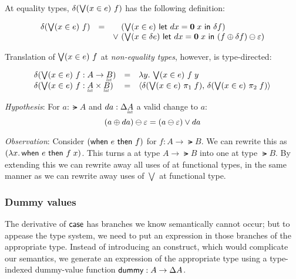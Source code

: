 \documentclass{article}
\newcommand{\dummy}{\ms{dummy}}
\begin{document}
At equality types, $\delta(\textstyle\bigvee({x \in e})\  f)$ has the following definition:

\[\begin{array}{rcl}
  \delta(\textstyle\bigvee({x \in e})\  f)
  &=& \phantom{\vee~} (\textstyle\bigvee({x \in e})\  \mathsf{let}~dx = \mathbf{0}\; x ~\mathsf{in}~ \delta f)
  \\ && \vee~ (\textstyle\bigvee({x \in \delta e})\  \mathsf{let}~dx = \mathbf{0}\; x ~\mathsf{in}~
    (f \oplus \delta f) \ominus \varepsilon)
\end{array}\]


Translation of $\textstyle\bigvee({x \in e})\  f$ at \emph{non-equality types}, however, is
type-directed:

\[\begin{array}{lcll}
  \delta(\downelim{x}{e}{f} : A \to \lat{B})
  &=& \fn\bind{y} \downelim{x}{e}{f\; y}\\
  \delta(\downelim{x}{e}{f} : \lat{A} \x \lat{B})
  &=& \pair{\delta(\downelim{x}{e}{\pi_1\; f})}
  {\delta(\downelim{x}{e}{\pi_2\; f})}
\end{array}\]

\emph{Hypothesis}: For $a : \lat{A}$ and $da : \GD\lat{A}$ a valid change to
$a$:
\begin{equation*}
  (a \oplus da) \ominus \varepsilon = (a \ominus \varepsilon)
  \vee da
\end{equation*}

\emph{Observation}: Consider $(\mathsf{when}~{e}~\mathsf{then}~{f})$ for $f : A \to \lat{B}$. We can
rewrite this as $(\lambda x.\, \mathsf{when}~{e}~\mathsf{then}~{f\; x})$. This turns a  at type
$A \to \lat{B}$ into one at type $\lat{B}$. By extending this we can rewrite
away all uses of  at functional types, in the same manner as we can
rewrite away uses of $\bigvee$ at functional type.



\subsubsection{Dummy values}

The derivative of $\mathsf{case}$ has branches we know semantically cannot occur;
but to appease the type system, we need to put an expression in those branches
of the appropriate type. Instead of introducing an  construct, which
would complicate our semantics, we generate an expression of the appropriate
type using a type-indexed dummy-value function $\dummy{} : A \to \Delta{A}$.
\end{document}
